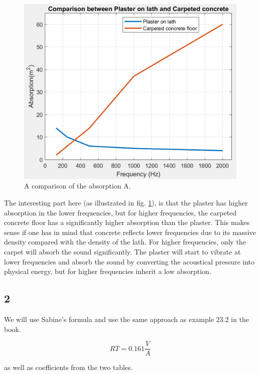 \documentclass{article}
\begin{document}
\begin{figure}[H]
    \centering
    \includegraphics[scale=0.9]{figures/oving1_1.png}
    \caption{A comparison of the absorption A.}
    \label{fig:compabs}
\end{figure}

The interesting part here (as illustrated in fig. \ref{fig:compabs}), is that the plaster has higher absorption in the lower frequencies, but for higher frequencies, the carpeted concrete floor has a significantly higher absorption than the plaster. This makes sense if one has in mind that concrete reflects lower frequencies due to its massive density compared with the density of the lath. For higher frequencies, only the carpet will absorb the sound significantly. The plaster will start to vibrate at lower frequencies and absorb the sound by converting the acoustical pressure into physical energy, but for higher frequencies inherit a low absorption.

\subsection*{2}

We will use Sabine's formula and use the same approach as example 23.2 in the book. 

\begin{equation}
    RT = 0.161 \frac{V}{A}
    \label{eq:sabine}
\end{equation}

as well as coefficients from the two tables.
\end{document}
